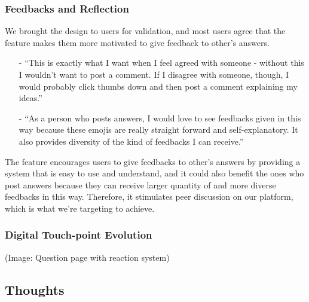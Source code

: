 \documentclass[a4paper]{article}
\begin{document}
    \subsubsection*{Feedbacks and Reflection}
    \noindent We brought the design to users for validation, and most users agree that the feature makes them more motivated to give feedback to other's answers.
    \begin{itemize}
        \item[-] ``This is exactly what I want when I feel agreed with someone - without this I wouldn't want to post a comment.
        If I disagree with someone, though, I would probably click thumbs down and then post a comment explaining my ideas.''
        \item[-] ``As a person who posts answers, I would love to see feedbacks given in this way because these emojis are really straight forward and self-explanatory.
        It also provides diversity of the kind of feedbacks I can receive.''
    \end{itemize}

    The feature encourages users to give feedbacks to other's answers by providing a system that is easy to use and understand,
    and it could also benefit the ones who post answers because they can receive larger quantity of and more diverse feedbacks in this way.
    Therefore, it stimulates peer discussion on our platform, which is what we're targeting to achieve.

    \subsubsection*{Digital Touch-point Evolution}
    \noindent (Image: Question page with reaction system)

    \subsection*{Thoughts}
\end{document}
